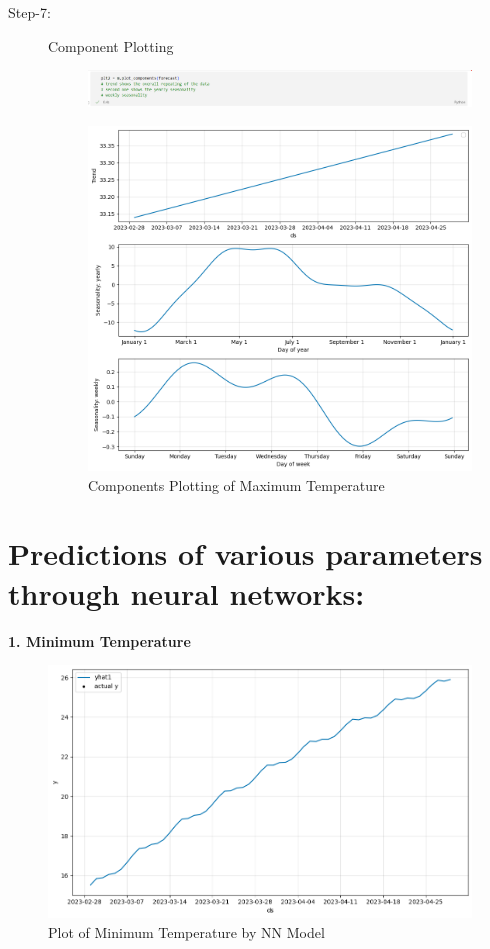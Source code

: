 \begin{description}
\pagebreak
\item[Step-7:] Component Plotting

\begin{figure}[hbt!]
  \centering
  \includegraphics[width=0.7\linewidth]{images/outputs/component plotting.png}
\end{figure}


 \begin{figure}[hbt!]
  \centering
  \includegraphics[width=0.7\linewidth]{images/outputs/neural temp_max trend.png}
  \caption{Components Plotting of Maximum Temperature}
\end{figure}

\end{description}
\pagebreak
\section{Predictions  of various parameters through neural networks:}
\textbf{1. Minimum Temperature}
\begin{figure}[hbt!]
  \centering
  \includegraphics[width=0.7\linewidth]{images/outputs/neural temp_min.png}
  \caption{Plot of Minimum Temperature by NN Model}
\end{figure}


